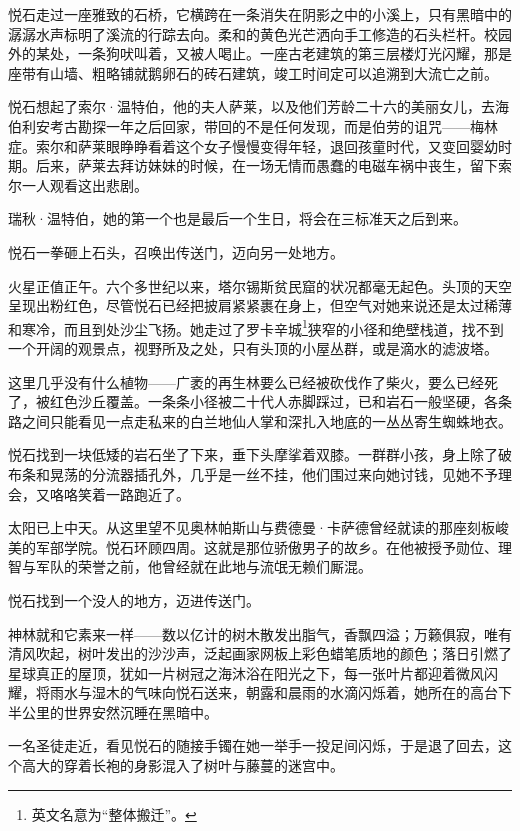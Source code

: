\documentclass[AutoFakeBold=true]{book}
\begin{document}
悦石走过一座雅致的石桥，它横跨在一条消失在阴影之中的小溪上，只有黑暗中的潺潺水声标明了溪流的行踪去向。柔和的黄色光芒洒向手工修造的石头栏杆。校园外的某处，一条狗吠叫着，又被人喝止。一座古老建筑的第三层楼灯光闪耀，那是座带有山墙、粗略铺就鹅卵石的砖石建筑，竣工时间定可以追溯到大流亡之前。

悦石想起了索尔·温特伯，他的夫人萨莱，以及他们芳龄二十六的美丽女儿，去海伯利安考古勘探一年之后回家，带回的不是任何发现，而是伯劳的诅咒——梅林症。索尔和萨莱眼睁睁看着这个女子慢慢变得年轻，退回孩童时代，又变回婴幼时期。后来，萨莱去拜访妹妹的时候，在一场无情而愚蠢的电磁车祸中丧生，留下索尔一人观看这出悲剧。

瑞秋·温特伯，她的第一个也是最后一个生日，将会在三标准天之后到来。

悦石一拳砸上石头，召唤出传送门，迈向另一处地方。

\vspace*{1em}

火星正值正午。六个多世纪以来，塔尔锡斯贫民窟的状况都毫无起色。头顶的天空呈现出粉红色，尽管悦石已经把披肩紧紧裹在身上，但空气对她来说还是太过稀薄和寒冷，而且到处沙尘飞扬。她走过了罗卡辛城\footnote{英文名意为``整体搬迁''。}狭窄的小径和绝壁栈道，找不到一个开阔的观景点，视野所及之处，只有头顶的小屋丛群，或是滴水的滤波塔。

这里几乎没有什么植物——广袤的再生林要么已经被砍伐作了柴火，要么已经死了，被红色沙丘覆盖。一条条小径被二十代人赤脚踩过，已和岩石一般坚硬，各条路之间只能看见一点走私来的白兰地仙人掌和深扎入地底的一丛丛寄生蜘蛛地衣。

悦石找到一块低矮的岩石坐了下来，垂下头摩挲着双膝。一群群小孩，身上除了破布条和晃荡的分流器插孔外，几乎是一丝不挂，他们围过来向她讨钱，见她不予理会，又咯咯笑着一路跑近了。

太阳已上中天。从这里望不见奥林帕斯山与费德曼·卡萨德曾经就读的那座刻板峻美的军部学院。悦石环顾四周。这就是那位骄傲男子的故乡。在他被授予勋位、理智与军队的荣誉之前，他曾经就在此地与流氓无赖们厮混。

悦石找到一个没人的地方，迈进传送门。

\vspace*{1em}

神林就和它素来一样——数以亿计的树木散发出脂气，香飘四溢；万籁俱寂，唯有清风吹起，树叶发出的沙沙声，泛起画家网板上彩色蜡笔质地的颜色；落日引燃了星球真正的屋顶，犹如一片树冠之海沐浴在阳光之下，每一张叶片都迎着微风闪耀，将雨水与湿木的气味向悦石送来，朝露和晨雨的水滴闪烁着，她所在的高台下半公里的世界安然沉睡在黑暗中。

一名圣徒走近，看见悦石的随接手镯在她一举手一投足间闪烁，于是退了回去，这个高大的穿着长袍的身影混入了树叶与藤蔓的迷宫中。
\end{document}
